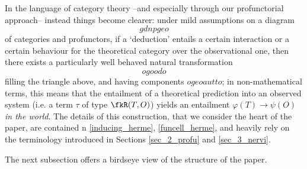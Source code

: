 In the language of category theory --and especially through our profunctorial approach-- instead things become clearer: under mild assumptions on a diagram 
\[ gdnpgeo \]
of categories and profunctors, if a `deduction' entails a certain interaction or a certain behaviour for the theoretical category over the observational one, then there exists a particularly well behaved natural transformation 
\[ ogoodo \]
filling the triangle above, and having components $ogeoautto$; in non\hyp{}mathematical terms, this means that the entailment of a theoretical prediction into an observed system (i.e. a term $\tau$ of type $\fkR(T,O)$) yields an entailment $\varphi(T) \to \psi(O)$ \emph{in the world}. The details of this construction, that we consider the heart of the paper, are contained n \autoref{inducing_herme}, \autoref{funcell_herme}, and heavily rely on the terminology introduced in Sections \ref{sec_2_profu} and \ref{sec_3_nervi}.

The next subsection offers a birdseye view of the structure of the paper.



